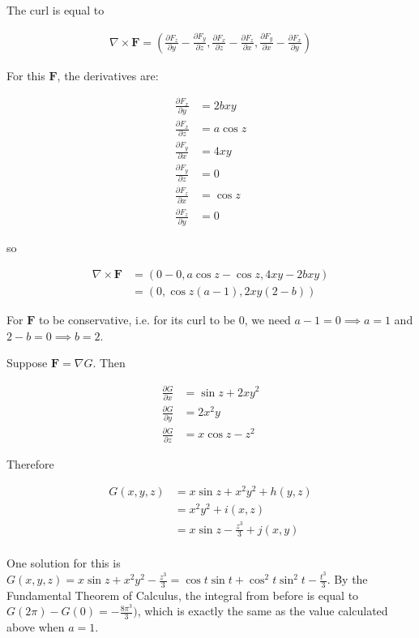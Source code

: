 The curl is equal to

\begin{align*}
  \nabla \times \mathbf{F} = \left(\frac{\partial F_z}{\partial y} - \frac{\partial F_y}{\partial z}, \frac{\partial F_x}{\partial z} - \frac{\partial F_z}{\partial x}, \frac{\partial F_y}{\partial x} - \frac{\partial F_x}{\partial y}\right)
\end{align*}

For this $\mathbf{F}$, the derivatives are:

\begin{align*}
  \frac{\partial F_x}{\partial y} &= 2bxy \\
  \frac{\partial F_x}{\partial z} &= a\cos z \\
  \frac{\partial F_y}{\partial x} &= 4xy \\
  \frac{\partial F_y}{\partial z} &= 0 \\
  \frac{\partial F_z}{\partial x} &= \cos z \\
  \frac{\partial F_z}{\partial y} &= 0
\end{align*}

so

\begin{align*}
  \nabla \times \mathbf{F} &= (0 - 0, a\cos z - \cos z, 4xy - 2bxy) \\
  &= (0, \cos z(a - 1), 2xy(2 - b))
\end{align*}

For $\mathbf{F}$ to be conservative, i.e. for its curl to be 0, we need $a - 1 = 0 \implies a = 1$ and $2 - b = 0 \implies b = 2$.

Suppose $\mathbf{F} = \nabla G$. Then

\begin{align*}
  \frac{\partial G}{\partial x} &= \sin z + 2xy^2 \\
  \frac{\partial G}{\partial y} &= 2x^2y \\
  \frac{\partial G}{\partial z} &= x \cos z - z^2
\end{align*}

Therefore

\begin{align*}
  G(x, y, z) &= x\sin z + x^2y^2 + h(y, z) \\
  &= x^2y^2 + i(x, z) \\
  &= x\sin z - \frac{z^3}{3} + j(x, y) \\
\end{align*}

One solution for this is $G(x, y, z) = x\sin z + x^2y^2 - \frac{z^3}{3} = \cos t \sin t + \cos^2 t \sin^2 t - \frac{t^3}{3}$. By the Fundamental Theorem of Calculus, the integral from before is equal to $G(2\pi) - G(0) = -\frac{8\pi^3}{3})$, which is exactly the same as the value calculated above when $a = 1$.

